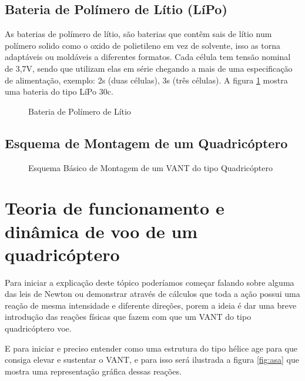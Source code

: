\subsection{Bateria de Polímero de Lítio (LíPo)}
As baterias de polímero de lítio, são baterias que contêm sais de lítio num polímero solido como o oxido de polietileno em vez de solvente, isso as torna adaptáveis ou moldáveis a diferentes formatos. Cada célula tem tensão nominal de 3,7V, sendo que utilizam elas em série chegando a mais de uma especificação de alimentação, exemplo: 2s (duas células), 3s (três células). A figura \ref{fig:bat} mostra uma bateria do tipo LíPo 30c.
\begin{figure}[H]
	\centering
	\caption{Bateria de Polímero de Lítio}
	\fontsize{9pt}{12pt}\selectfont
	\def\svgwidth{15cm}
	
	\label{fig:bat}
\end{figure}

\subsection{Esquema de Montagem de um Quadricóptero}
\begin{figure}[H]
  \centering
  \caption{Esquema Básico de Montagem de um VANT do tipo Quadricóptero}
  \fontsize{9pt}{12pt}\selectfont
  \def\svgwidth{15cm}
  
  \label{fig:esquemamont}
\end{figure}
\section{Teoria de funcionamento e dinâmica de voo de um quadricóptero}

Para iniciar a explicação deste tópico poderíamos começar falando sobre alguma das leis de Newton ou demonstrar através de cálculos que toda a ação possui uma reação de mesma intensidade e diferente direções, porem a ideia é dar uma breve introdução das reações físicas que fazem com que um VANT do tipo quadricóptero voe. 

E para iniciar e preciso entender como uma estrutura do tipo hélice age para que consiga elevar e sustentar o VANT, e para isso será ilustrada a figura \ref{fig:asa} que mostra uma representação gráfica dessas reações. 

